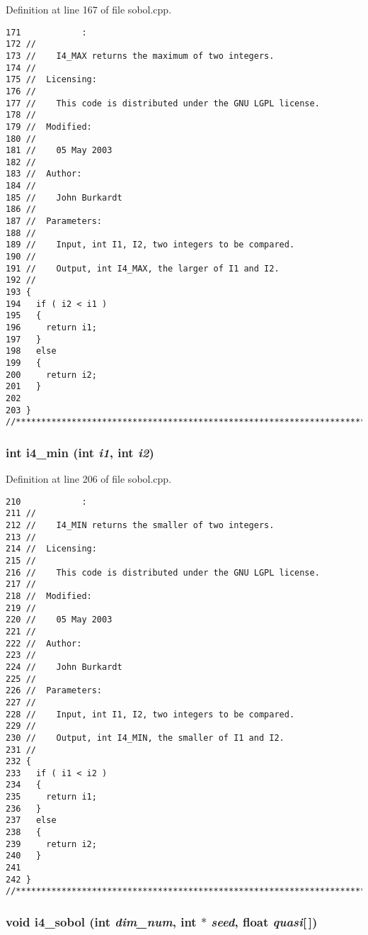 Definition at line 167 of file sobol.cpp.

\begin{Code}\begin{verbatim}171            :
172 //
173 //    I4_MAX returns the maximum of two integers.
174 //
175 //  Licensing:
176 //
177 //    This code is distributed under the GNU LGPL license. 
178 //
179 //  Modified:
180 //
181 //    05 May 2003
182 //
183 //  Author:
184 //
185 //    John Burkardt
186 //
187 //  Parameters:
188 //
189 //    Input, int I1, I2, two integers to be compared.
190 //
191 //    Output, int I4_MAX, the larger of I1 and I2.
192 //
193 {
194   if ( i2 < i1 ) 
195   {
196     return i1;
197   }
198   else 
199   {
200     return i2;
201   }
202 
203 }
//****************************************************************************80
\end{verbatim}
\end{Code}


\subsubsection{\setlength{\rightskip}{0pt plus 5cm}int i4\_\-min (int {\em i1}, int {\em i2})}\label{test_2sobol_8H_e73c30e1658d722ce9ff2e671db331ca}




Definition at line 206 of file sobol.cpp.

\begin{Code}\begin{verbatim}210            :
211 //
212 //    I4_MIN returns the smaller of two integers.
213 //
214 //  Licensing:
215 //
216 //    This code is distributed under the GNU LGPL license. 
217 //
218 //  Modified:
219 //
220 //    05 May 2003
221 //
222 //  Author:
223 //
224 //    John Burkardt
225 //
226 //  Parameters:
227 //
228 //    Input, int I1, I2, two integers to be compared.
229 //
230 //    Output, int I4_MIN, the smaller of I1 and I2.
231 //
232 {
233   if ( i1 < i2 ) 
234   {
235     return i1;
236   }
237   else 
238   {
239     return i2;
240   }
241 
242 }
//****************************************************************************80
\end{verbatim}
\end{Code}


\subsubsection{\setlength{\rightskip}{0pt plus 5cm}void i4\_\-sobol (int {\em dim\_\-num}, int $\ast$ {\em seed}, float {\em quasi}[$\,$])}\label{test_2sobol_8H_48eef243aae5f2979b1f88a3867b34e0}





